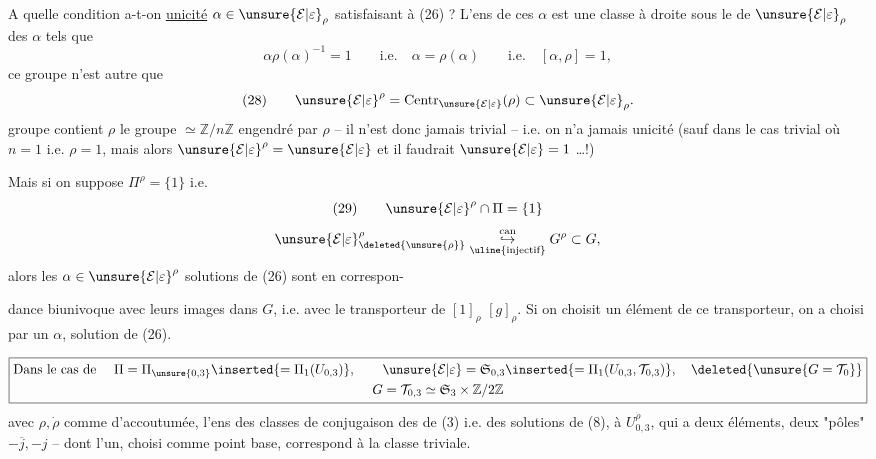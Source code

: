 A quelle condition a-t-on \uline{unicité}  $\alpha\in\unsure{\mathcal E|\varepsilon}_\rho$ satisfaisant à (26) ?
L'ens de ces $\alpha$ est une classe à droite sous le  de $\unsure{\mathcal E|\varepsilon}_\rho$  des $\alpha$ tels que 
\[
\alpha\rho(\alpha)^{-1}=1\qquad\text{i.e.}\quad
\alpha=\rho(\alpha)\qquad\text{i.e.}\quad[\alpha,\rho]=1,
\]
ce groupe n'est autre que 
\[
(28)\qquad\unsure{\mathcal E|\varepsilon}^\rho=\operatorname{Centr}_{\unsure{\mathcal E|\varepsilon}}(\rho)\subset\unsure{\mathcal E|\varepsilon}_\rho.
\]
 groupe contient $\rho$  le groupe $\simeq\mathbb Z/n\mathbb Z$  engendré par $\rho$ -- il n'est donc jamais trivial -- i.e. on n'a jamais unicité (sauf dans le cas trivial où \deleted{\unsure{$\rho$}} $n=1$ i.e. $\rho=1$,  mais alors $\unsure{\mathcal E|\varepsilon}^\rho=\unsure{\mathcal E|\varepsilon}$ et il faudrait $\unsure{\mathcal E|\varepsilon}=1$ \dots !)

Mais si on suppose $\Pi^\rho=\{1\}$ i.e.
\[
(29)\qquad\unsure{\mathcal E|\varepsilon}^\rho\cap\Pi=\{1\}
\]
\[
\unsure{\mathcal E|\varepsilon}^\rho_{\deleted{\unsure{\rho}}}
\underset{\uline{\text{injectif}}}{\overset{\mathrm{can}}{\hookrightarrow}}
G^\rho\subset G,
\]
alors les $\alpha\in\unsure{\mathcal E|\varepsilon}^\rho$ solutions de (26) sont en correspon-


dance biunivoque avec leurs images \inserted{$\dot\alpha$} dans $G$, i.e. avec le transporteur  de $[1]_\rho$  $[g]_\rho$.
Si on choisit un élément de ce transporteur, on a choisi par  un $\alpha$, solution de (26).

\[
\boxed{\begin{gathered}
\text{Dans le cas de }\quad
\Pi=\Pi_{\unsure{0,3}}\inserted{=\Pi_1(U_{0,3})},\qquad
\unsure{\mathcal E|\varepsilon}=\mathfrak S_{0,3}
\inserted{=\Pi_1(U_{0,3},\mathcal T_{0,3})},
\quad\deleted{\unsure{G=\mathcal T_0}}\\
G=\mathcal T_{0,3}\simeq\mathfrak S_3\times\mathbb Z/2\mathbb Z
\end{gathered}}
\]
avec $\rho,\dot\rho$ comme d'accoutumée, l'ens des classes de conjugaison des  de (3) i.e. des solutions de (8),  à $U_{0,3}^{\dot\rho}$, qui a deux éléments,  deux "pôles" $-\overline j,-j$ -- dont l'un, choisi comme point base, correspond à la classe triviale.

